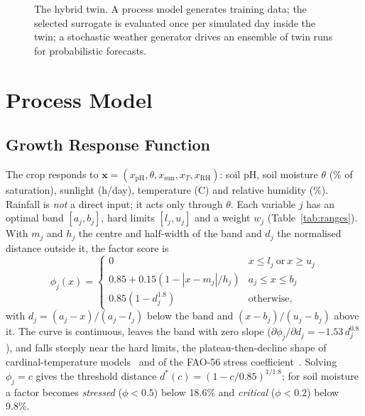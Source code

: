 \documentclass[conference]{IEEEtran}
\begin{document}
\begin{figure}[t]
\caption{The hybrid twin. A process model generates training data; the selected surrogate is
evaluated once per simulated day inside the twin; a stochastic weather generator drives an
ensemble of twin runs for probabilistic forecasts.}
\label{fig:arch}
\end{figure}

\section{Process Model}\label{sec:process}

\subsection{Growth Response Function}
The crop responds to $\mathbf{x} = (x_{\mathrm{pH}}, \theta, x_{\mathrm{sun}}, x_T, x_{\mathrm{RH}})$:
soil pH, soil moisture $\theta$ (\% of saturation), sunlight (h/day), temperature
(\textdegree C) and relative humidity (\%). Rainfall is \emph{not} a direct input; it acts
only through $\theta$. Each variable $j$ has an optimal band $[a_j, b_j]$, hard limits
$[l_j, u_j]$ and a weight $w_j$ (Table~\ref{tab:ranges}). With $m_j$ and $h_j$ the centre and
half-width of the band and $d_j$ the normalised distance outside it, the factor score is
\begin{equation}\label{eq:phi}
\phi_j(x) =
\begin{cases}
0 & x \le l_j \ \text{or}\ x \ge u_j \\[2pt]
0.85 + 0.15\left(1 - |x-m_j|/h_j\right) & a_j \le x \le b_j \\[2pt]
0.85\left(1 - d_j^{1.8}\right) & \text{otherwise,}
\end{cases}
\end{equation}
with $d_j = (a_j - x)/(a_j - l_j)$ below the band and $(x - b_j)/(u_j - b_j)$ above it. The curve
is continuous, leaves the band with zero slope ($\partial\phi_j/\partial d_j = -1.53\,d_j^{0.8}$),
and falls steeply near the hard limits, the plateau-then-decline shape of cardinal-temperature
models~\cite{yan1999equation} and of the FAO-56 stress coefficient~\cite{allen1998crop}. Solving
$\phi_j = c$ gives the threshold distance $d^*(c) = (1 - c/0.85)^{1/1.8}$; for soil moisture a
factor becomes \emph{stressed} ($\phi < 0.5$) below 18.6\% and \emph{critical} ($\phi < 0.2$)
below 9.8\%.
\end{document}
